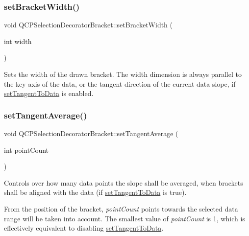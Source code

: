 \subsubsection{\texorpdfstring{set\+Bracket\+Width()}{setBracketWidth()}}
{\footnotesize\ttfamily void Q\+C\+P\+Selection\+Decorator\+Bracket\+::set\+Bracket\+Width (\begin{DoxyParamCaption}\item[{int}]{width }\end{DoxyParamCaption})}

Sets the width of the drawn bracket. The width dimension is always parallel to the key axis of the data, or the tangent direction of the current data slope, if \hyperlink{classQCPSelectionDecoratorBracket_a93bc6086e53a5e40a08641a7b2e2cdd5}{set\+Tangent\+To\+Data} is enabled. \mbox{\label{classQCPSelectionDecoratorBracket_adb2d0876f25a77c88042b70818f1d6e4}} 
\subsubsection{\texorpdfstring{set\+Tangent\+Average()}{setTangentAverage()}}
{\footnotesize\ttfamily void Q\+C\+P\+Selection\+Decorator\+Bracket\+::set\+Tangent\+Average (\begin{DoxyParamCaption}\item[{int}]{point\+Count }\end{DoxyParamCaption})}

Controls over how many data points the slope shall be averaged, when brackets shall be aligned with the data (if \hyperlink{classQCPSelectionDecoratorBracket_a93bc6086e53a5e40a08641a7b2e2cdd5}{set\+Tangent\+To\+Data} is true).

From the position of the bracket, {\itshape point\+Count} points towards the selected data range will be taken into account. The smallest value of {\itshape point\+Count} is 1, which is effectively equivalent to disabling \hyperlink{classQCPSelectionDecoratorBracket_a93bc6086e53a5e40a08641a7b2e2cdd5}{set\+Tangent\+To\+Data}. \mbox{\label{classQCPSelectionDecoratorBracket_a93bc6086e53a5e40a08641a7b2e2cdd5}} 
